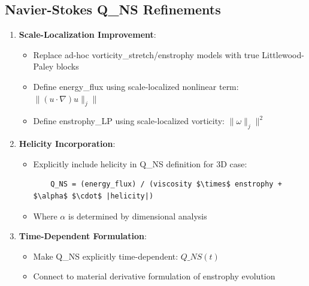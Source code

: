 \documentclass[11pt]{article}
\begin{document}
\subsection{Navier-Stokes Q\_NS Refinements}
\begin{enumerate}
\item \textbf{Scale-Localization Improvement}:
  \begin{itemize}
  \item Replace ad-hoc vorticity\_stretch/enstrophy models with true Littlewood-Paley blocks
  \item Define energy\_flux using scale-localized nonlinear term: $\|(u\cdot\nabla)u\|_j\|$
  \item Define enstrophy\_LP using scale-localized vorticity: $\|\omega\|_j\|^2$
  \end{itemize}
\item \textbf{Helicity Incorporation}:
  \begin{itemize}
  \item Explicitly include helicity in Q\_NS definition for 3D case:
    \begin{verbatim}
    Q_NS = (energy_flux) / (viscosity $\times$ enstrophy + $\alpha$ $\cdot$ |helicity|)
    \end{verbatim}
  \item Where $\alpha$ is determined by dimensional analysis
  \end{itemize}
\item \textbf{Time-Dependent Formulation}:
  \begin{itemize}
  \item Make Q\_NS explicitly time-dependent: $Q\_NS(t)$
  \item Connect to material derivative formulation of enstrophy evolution
  \end{itemize}
\end{enumerate}
\end{document}
